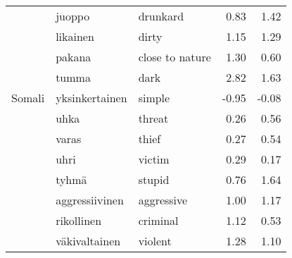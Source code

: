 \begin{tabular}{lllrr}
       & juoppo & drunkard &         0.83 &               1.42 \\
       & likainen & dirty &         1.15 &               1.29 \\
       & pakana & close to nature &         1.30 &               0.60 \\
       & tumma & dark &         2.82 &               1.63 \\
Somali & yksinkertainen & simple &        -0.95 &              -0.08 \\
       & uhka & threat &         0.26 &               0.56 \\
       & varas & thief &         0.27 &               0.54 \\
       & uhri & victim &         0.29 &               0.17 \\
       & tyhmä & stupid &         0.76 &               1.64 \\
       & aggressiivinen & aggressive &         1.00 &               1.17 \\
       & rikollinen & criminal &         1.12 &               0.53 \\
       & väkivaltainen & violent &         1.28 &               1.10 \\
\bottomrule
\end{tabular}
